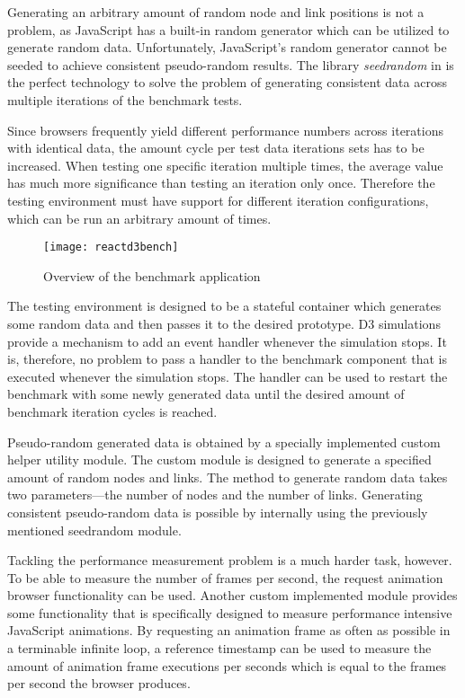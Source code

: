 Generating an arbitrary amount of random node and link positions is not a problem, as JavaScript has a built-in random generator which can be utilized to generate random data. Unfortunately, JavaScript's random generator cannot be seeded to achieve consistent pseudo-random results. The library \emph{seedrandom} in \cite{SeedRandom} is the perfect technology to solve the problem of generating consistent data across multiple iterations of the benchmark tests.

Since browsers frequently yield different performance numbers across iterations with identical data, the amount cycle per test data iterations sets has to be increased. When testing one specific iteration multiple times, the average value has much more significance than testing an iteration only once. Therefore the testing environment must have support for different iteration configurations, which can be run an arbitrary amount of times.

\begin{figure}
  \centering
  \texttt{[image: reactd3bench]}
  \caption{Overview of the benchmark application}
  \label{fig:reactD3bench1}
\end{figure}

The testing environment is designed to be a stateful container which generates some random data and then passes it to the desired prototype. D3 simulations provide a mechanism to add an event handler whenever the simulation stops. It is, therefore, no problem to pass a handler to the benchmark component that is executed whenever the simulation stops. The handler can be used to restart the benchmark with some newly generated data until the desired amount of benchmark iteration cycles is reached.

Pseudo-random generated data is obtained by a specially implemented custom helper utility module. The custom module is designed to generate a specified amount of random nodes and links. The method to generate random data takes two parameters---the number of nodes and the number of links. Generating consistent pseudo-random data is possible by internally using the previously mentioned seedrandom module.

Tackling the performance measurement problem is a much harder task, however. To be able to measure the number of frames per second, the request animation browser functionality can be used. Another custom implemented module provides some functionality that is specifically designed to measure performance intensive JavaScript animations. By requesting an animation frame as often as possible in a terminable infinite loop, a reference timestamp can be used to measure the amount of animation frame executions per seconds which is equal to the frames per second the browser produces.

